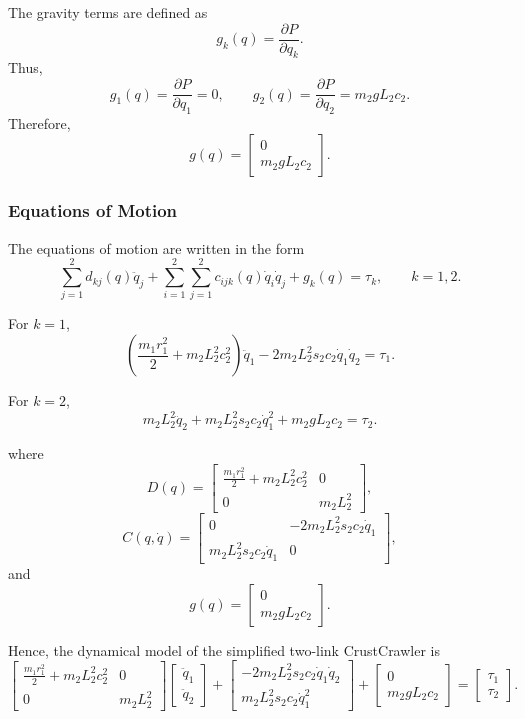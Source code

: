 \documentclass{article}
\begin{document}
The gravity terms are defined as
\[
g_k(q)=\frac{\partial P}{\partial q_k}.
\]
Thus,
\[
g_1(q)=\frac{\partial P}{\partial q_1}=0,
\qquad
g_2(q)=\frac{\partial P}{\partial q_2}=m_2gL_2c_2.
\]
Therefore,
\[
g(q)=
\begin{bmatrix}
0\\
m_2gL_2c_2
\end{bmatrix}.
\]

\subsubsection*{Equations of Motion}

The equations of motion are written in the form
\[
\sum_{j=1}^{2} d_{kj}(q)\ddot q_j
+
\sum_{i=1}^{2}\sum_{j=1}^{2} c_{ijk}(q)\dot q_i\dot q_j
+
g_k(q)
=
\tau_k,
\qquad k=1,2.
\]

For \(k=1\),
\[
\left(\frac{m_1r_1^2}{2} + m_2L_2^2 c_2^2\right)\ddot q_1
-2m_2L_2^2 s_2 c_2 \dot q_1 \dot q_2
=
\tau_1.
\]

For \(k=2\),
\[
m_2L_2^2 \ddot q_2
+ m_2L_2^2 s_2 c_2 \dot q_1^2
+ m_2gL_2c_2
=
\tau_2.
\]

where
\[
D(q)
=
\begin{bmatrix}
\frac{m_1r_1^2}{2} + m_2L_2^2 c_2^2 & 0\\
0 & m_2L_2^2
\end{bmatrix},
\]
\[
C(q,\dot q)
=
\begin{bmatrix}
0 & -2m_2L_2^2 s_2 c_2 \dot q_1\\
m_2L_2^2 s_2 c_2 \dot q_1 & 0
\end{bmatrix},
\]
and
\[
g(q)
=
\begin{bmatrix}
0\\
m_2gL_2c_2
\end{bmatrix}.
\]

Hence, the dynamical model of the simplified two-link CrustCrawler is
\[
\begin{bmatrix}
\frac{m_1r_1^2}{2} + m_2L_2^2 c_2^2 & 0\\
0 & m_2L_2^2
\end{bmatrix}
\begin{bmatrix}
\ddot q_1\\
\ddot q_2
\end{bmatrix}
+
\begin{bmatrix}
-2m_2L_2^2 s_2 c_2 \dot q_1\dot q_2\\
m_2L_2^2 s_2 c_2 \dot q_1^2
\end{bmatrix}
+
\begin{bmatrix}
0\\
m_2gL_2c_2
\end{bmatrix}
=
\begin{bmatrix}
\tau_1\\
\tau_2
\end{bmatrix}.
\]
\end{document}
